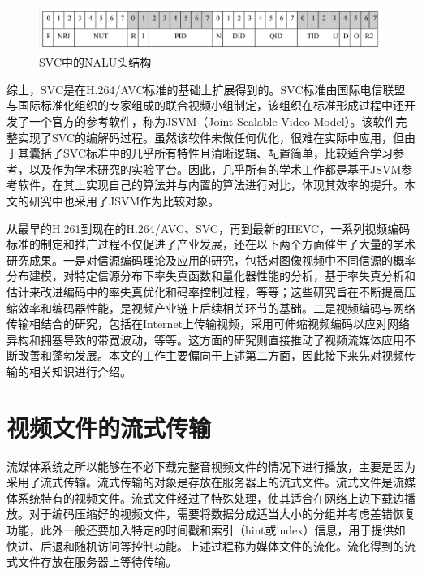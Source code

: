 \begin{figure}[h]
	\centering
	\includegraphics[width = 1.0\linewidth]{clip/05.png}
	\caption{SVC中的NALU头结构\label{fig:05}}
\end{figure}

综上，SVC是在H.264/AVC标准的基础上扩展得到的。SVC标准由国际电信联盟与国际标准化组织的专家组成的联合视频小组制定，该组织在标准形成过程中还开发了一个官方的参考软件，称为JSVM（Joint Scalable Video Model）\supercite{JSVM}。该软件完整实现了SVC的编解码过程。虽然该软件未做任何优化，很难在实际中应用，但由于其囊括了SVC标准中的几乎所有特性且清晰逻辑、配置简单，比较适合学习参考，以及作为学术研究的实验平台。因此，几乎所有的学术工作都是基于JSVM参考软件，在其上实现自己的算法并与内置的算法进行对比，体现其效率的提升。本文的研究中也采用了JSVM作为比较对象。

从最早的H.261到现在的H.264/AVC、SVC，再到最新的HEVC，一系列视频编码标准的制定和推广过程不仅促进了产业发展，还在以下两个方面催生了大量的学术研究成果。一是对信源编码理论及应用的研究，包括对图像视频中不同信源的概率分布建模\supercite{Birney-TIP1995, Lam-TIP2000, Sharifi-TCSVT1995, Kamaci-TCSVT2005}，对特定信源分布下率失真函数和量化器性能的分析\supercite{He-TCSVT2001, Gary-TIT1996, Gary-VCIP2005}，基于率失真分析和估计来改进编码中的率失真优化和码率控制过程\supercite{Gary-SPM1998, Lin-TCSVT1998, Sun-TCSVT2006, Lee-TCSVT2014}，等等；这些研究旨在不断提高压缩效率和编码器性能，是视频产业链上后续相关环节的基础。二是视频编码与网络传输相结合的研究\supercite{Sun-book-2001}，包括在Internet上传输视频\supercite{Wu-TCSVT2001, Conklin-TCSVT2001}，采用可伸缩视频编码以应对网络异构和拥塞导致的带宽波动\supercite{Wu-IEEE2001, Ohm-IEEE2005}，等等。这方面的研究则直接推动了视频流媒体应用不断改善和蓬勃发展。本文的工作主要偏向于上述第二方面，因此接下来先对视频传输的相关知识进行介绍。

\section{视频文件的流式传输}

流媒体系统之所以能够在不必下载完整音视频文件的情况下进行播放，主要是因为采用了流式传输。流式传输的对象是存放在服务器上的流式文件。流式文件是流媒体系统特有的视频文件。流式文件经过了特殊处理，使其适合在网络上边下载边播放。对于编码压缩好的视频文件，需要将数据分成适当大小的分组并考虑差错恢复功能，此外一般还要加入特定的时间戳和索引（hint或index）信息，用于提供如快进、后退和随机访问等控制功能。上述过程称为媒体文件的流化。流化得到的流式文件存放在服务器上等待传输。

